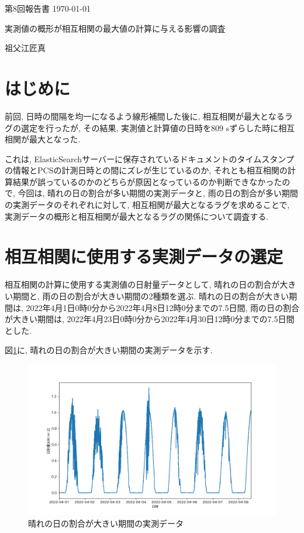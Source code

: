 \documentclass[a4j,12pt,]{jarticle}
\begin{document}
{\noindent\small 第8回報告書 \hfill\today}
\begin{center}
  {\Large 実測値の概形が相互相関の最大値の計算に与える影響の調査}
\end{center}
\begin{flushright}
  祖父江匠真 \\
\end{flushright}

\section{はじめに}
前回, 日時の間隔を均一になるよう線形補間した後に, 相互相関が最大となるラグの選定を行ったが, その結果, 実測値と計算値の日時を809 \si{\second}ずらした時に相互相関が最大となった.

これは, ElasticSearchサーバーに保存されているドキュメントのタイムスタンプの情報とPCSの計測日時との間にズレが生じているのか, それとも相互相関の計算結果が誤っているのかのどちらが原因となっているのか判断できなかったので, 今回は, 晴れの日の割合が多い期間の実測データと, 雨の日の割合が多い期間の実測データのそれぞれに対して, 相互相関が最大となるラグを求めることで, 実測データの概形と相互相関が最大となるラグの関係について調査する.

\section{相互相関に使用する実測データの選定}
相互相関の計算に使用する実測値の日射量データとして, 晴れの日の割合が大きい期間と, 雨の日の割合が大きい期間の2種類を選ぶ.
晴れの日の割合が大きい期間は, 2022年4月1日0時0分から2022年4月8日12時0分までの7.5日間, 雨の日の割合が大きい期間は, 2022年4月23日0時0分から2022年4月30日12時0分までの7.5日間とした.

図\ref{p1}に, 晴れの日の割合が大きい期間の実測データを示す.

\begin{figure}[H]
  \begin{center}
    \includegraphics[width=160mm]{1.png}
    \caption{晴れの日の割合が大きい期間の実測データ}
    \label{p1}
  \end{center}
\end{figure}
\end{document}
